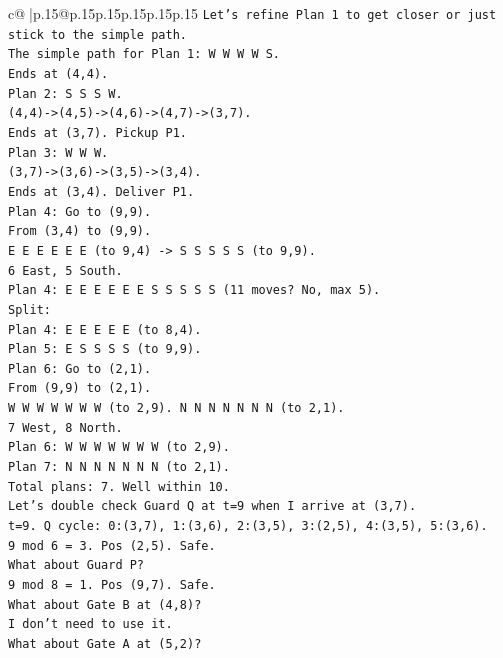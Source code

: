 \documentclass{article}
\begin{document}
{\begin{supertabular}{c@{$\;$}|p{.15\linewidth}@{}p{.15\linewidth}p{.15\linewidth}p{.15\linewidth}p{.15\linewidth}p{.15\linewidth}}
{{{\texttt{Let's refine Plan 1 to get closer or just stick to the simple path.} \\
\texttt{The simple path for Plan 1: W W W W S.} \\
\texttt{Ends at (4,4).} \\
\texttt{Plan 2: S S S W.} \\
\texttt{(4,4){-}>(4,5){-}>(4,6){-}>(4,7){-}>(3,7).} \\
\texttt{Ends at (3,7). Pickup P1.} \\
\texttt{Plan 3: W W W.} \\
\texttt{(3,7){-}>(3,6){-}>(3,5){-}>(3,4).} \\
\texttt{Ends at (3,4). Deliver P1.} \\
\texttt{Plan 4: Go to (9,9).} \\
\texttt{From (3,4) to (9,9).} \\
\texttt{E E E E E E (to 9,4) {-}> S S S S S (to 9,9).} \\
\texttt{6 East, 5 South.} \\
\texttt{Plan 4: E E E E E E S S S S S (11 moves? No, max 5).} \\
\texttt{Split:} \\
\texttt{Plan 4: E E E E E (to 8,4).} \\
\texttt{Plan 5: E S S S S (to 9,9).} \\
\texttt{Plan 6: Go to (2,1).} \\
\texttt{From (9,9) to (2,1).} \\
\texttt{W W W W W W W (to 2,9). N N N N N N N (to 2,1).} \\
\texttt{7 West, 8 North.} \\
\texttt{Plan 6: W W W W W W W (to 2,9).} \\
\texttt{Plan 7: N N N N N N N (to 2,1).} \\
\texttt{Total plans: 7. Well within 10.} \\
\texttt{Let's double check Guard Q at t=9 when I arrive at (3,7).} \\
\texttt{t=9. Q cycle: 0:(3,7), 1:(3,6), 2:(3,5), 3:(2,5), 4:(3,5), 5:(3,6).} \\
\texttt{9 mod 6 = 3. Pos (2,5). Safe.} \\
\texttt{What about Guard P?} \\
\texttt{9 mod 8 = 1. Pos (9,7). Safe.} \\
\texttt{What about Gate B at (4,8)?} \\
\texttt{I don't need to use it.} \\
\texttt{What about Gate A at (5,2)?} \\
}}}
\end{supertabular}}
\end{document}

